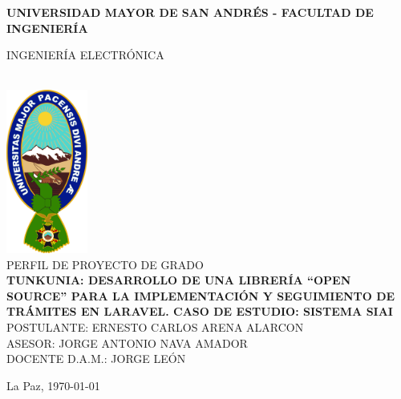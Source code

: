 \begin{titlepage}
    \centering
    {\bfseries \large 
    UNIVERSIDAD MAYOR DE SAN ANDRÉS - FACULTAD DE INGENIERÍA\par 
    INGENIERÍA 	ELECTRÓNICA
    }\\[2cm]
    
    \includegraphics[width=0.2\textwidth]{assets/umsa.png}\\[1cm]
    
    {\LARGE \MakeUppercase{Perfil de Proyecto de Grado}}\\[1cm]
    
    \textbf{\Large \MakeUppercase{TUNKUNIA: Desarrollo de una librería “Open Source” para la implementación y seguimiento de trámites en Laravel. Caso de estudio: Sistema SIAI}}
    \vfill
    \MakeUppercase{Postulante: }
    \MakeUppercase{Ernesto Carlos Arena Alarcon}\\[1cm]
    
    \MakeUppercase{Asesor: }
    \MakeUppercase{Jorge Antonio Nava Amador}\\[1cm]
    
    \MakeUppercase{Docente D.A.M.: }
    \MakeUppercase{Jorge León}\\[1cm]
    
    \vfill
    {La Paz, \today\par}
\end{titlepage}